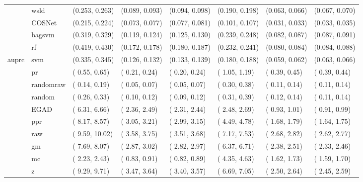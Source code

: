 \begin{table}[H]
{\begin{tabular}{llllllll}
 & wsld & (0.253, 0.263) & (0.089, 0.093) & (0.094, 0.098) & (0.190, 0.198) & (0.063, 0.066) & (0.067, 0.070)\\

 & COSNet & (0.215, 0.224) & (0.073, 0.077) & (0.077, 0.081) & (0.101, 0.107) & (0.031, 0.033) & (0.033, 0.035)\\

 & bagsvm & (0.319, 0.329) & (0.119, 0.124) & (0.125, 0.130) & (0.239, 0.248) & (0.082, 0.087) & (0.087, 0.091)\\

 & rf & (0.419, 0.430) & (0.172, 0.178) & (0.180, 0.187) & (0.232, 0.241) & (0.080, 0.084) & (0.084, 0.088)\\

\multirow{-15}{*}{\raggedright\arraybackslash auprc} & svm & (0.335, 0.345) & (0.126, 0.132) & (0.133, 0.139) & (0.180, 0.188) & (0.059, 0.062) & (0.063, 0.066)\\
\cmidrule{1-8}
 & pr & ( 0.55,  0.65) & ( 0.21,  0.24) & ( 0.20,  0.24) & ( 1.05,  1.19) & ( 0.39,  0.45) & ( 0.39,  0.44)\\

 & randomraw & ( 0.14,  0.19) & ( 0.05,  0.07) & ( 0.05,  0.07) & ( 0.30,  0.38) & ( 0.11,  0.14) & ( 0.11,  0.14)\\

 & random & ( 0.26,  0.33) & ( 0.10,  0.12) & ( 0.09,  0.12) & ( 0.31,  0.39) & ( 0.12,  0.14) & ( 0.11,  0.14)\\

 & EGAD & ( 6.31,  6.66) & ( 2.36,  2.49) & ( 2.31,  2.44) & ( 2.48,  2.69) & ( 0.93,  1.01) & ( 0.91,  0.99)\\

 & ppr & ( 8.17,  8.57) & ( 3.05,  3.21) & ( 2.99,  3.15) & ( 4.49,  4.78) & ( 1.68,  1.79) & ( 1.64,  1.75)\\

 & raw & ( 9.59, 10.02) & ( 3.58,  3.75) & ( 3.51,  3.68) & ( 7.17,  7.53) & ( 2.68,  2.82) & ( 2.62,  2.77)\\

 & gm & ( 7.69,  8.07) & ( 2.87,  3.02) & ( 2.82,  2.97) & ( 6.37,  6.71) & ( 2.38,  2.51) & ( 2.33,  2.46)\\

 & mc & ( 2.23,  2.43) & ( 0.83,  0.91) & ( 0.82,  0.89) & ( 4.35,  4.63) & ( 1.62,  1.73) & ( 1.59,  1.70)\\

 & z & ( 9.29,  9.71) & ( 3.47,  3.64) & ( 3.40,  3.57) & ( 6.69,  7.05) & ( 2.50,  2.64) & ( 2.45,  2.59)\\


\end{tabular}}
\end{table}
